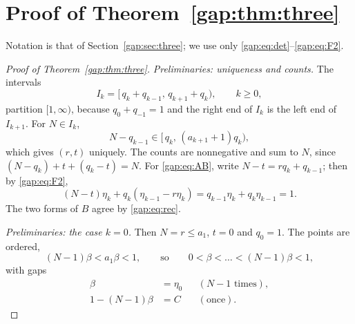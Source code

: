 \section{Proof of Theorem~\ref{gap:thm:three}}\label{app:threegap}

Notation is that of Section~\ref{gap:sec:three}; we use only \eqref{gap:eq:det}--\eqref{gap:eq:F2}.

\begin{proof}[Proof of Theorem~\ref{gap:thm:three}]
\emph{Preliminaries: uniqueness and counts.} The intervals
\[
I_k=[\,q_k+q_{k-1},\,q_{k+1}+q_k),\qquad k\ge0,
\]
partition $[1,\infty)$, because $q_0+q_{-1}=1$ and the right end of $I_k$ is the left end of $I_{k+1}$.
For $N\in I_k$,
\[
N-q_{k-1}\in[\,q_k,\,(a_{k+1}+1)q_k),
\]
which gives $(r,t)$ uniquely. The counts are nonnegative and sum to $N$, since $(N-q_k)+t+(q_k-t)=N$.
For \eqref{gap:eq:AB}, write $N-t=rq_k+q_{k-1}$; then by \eqref{gap:eq:F2},
\[
(N-t)\eta_k+q_k(\eta_{k-1}-r\eta_k)=q_{k-1}\eta_k+q_k\eta_{k-1}=1.
\]
The two forms of $B$ agree by \eqref{gap:eq:rec}.

\emph{Preliminaries: the case $k=0$.} Then $N=r\le a_1$, $t=0$ and $q_0=1$. The points are ordered,
\[
(N-1)\beta<a_1\beta<1,\qquad\text{so}\qquad 0<\beta<\dots<(N-1)\beta<1,
\]
with gaps
\begin{align*}
\beta&=\eta_0 &&(N-1\text{ times}),\\
1-(N-1)\beta&=C &&(\text{once}).
\end{align*}


\end{proof}
